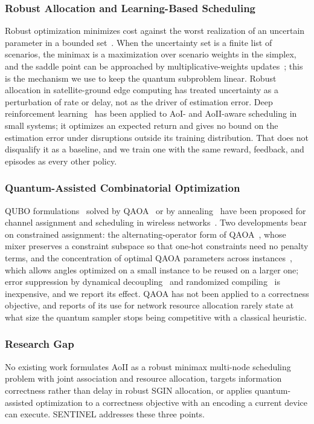 \subsubsection{Robust Allocation and Learning-Based Scheduling}
Robust optimization minimizes cost against the worst realization of an uncertain parameter in a bounded
set~\cite{BenTal2009, Bertsimas2004}. When the uncertainty set is a finite list of scenarios, the minimax is a
maximization over scenario weights in the simplex, and the saddle point can be approached by multiplicative-weights
updates~\cite{Arora2012}; this is the mechanism we use to keep the quantum subproblem linear. Robust allocation in
satellite-ground edge computing has treated uncertainty as a perturbation of rate or delay, not as the driver of
estimation error. Deep reinforcement learning~\cite{Mnih2015, Schulman2017} has been applied to AoI- and AoII-aware
scheduling in small systems; it optimizes an expected return and gives no bound on the estimation error under
disruptions outside its training distribution. That does not disqualify it as a baseline, and we train one with the
same reward, feedback, and episodes as every other policy.

\subsubsection{Quantum-Assisted Combinatorial Optimization}
QUBO formulations~\cite{Lucas2014} solved by QAOA~\cite{Farhi2014} or by annealing~\cite{Albash2018} have been proposed for channel assignment and scheduling in wireless
networks~\cite{Kim2019}. Two developments bear on constrained assignment: the alternating-operator form of
QAOA~\cite{Hadfield2019}, whose mixer preserves a constraint subspace so that one-hot constraints need no penalty
terms, and the concentration of optimal QAOA parameters across instances~\cite{Brandao2018}, which allows angles
optimized on a small instance to be reused on a larger one; error suppression by dynamical
decoupling~\cite{Viola1999} and randomized compiling~\cite{Wallman2016} is inexpensive, and we report its effect.
QAOA has not been applied to a correctness objective, and reports of its use for network resource allocation rarely
state at what size the quantum sampler stops being competitive with a classical heuristic.

\subsubsection{Research Gap}
No existing work formulates AoII as a robust minimax multi-node scheduling problem with joint association and
resource allocation, targets information correctness rather than delay in robust SGIN allocation, or applies
quantum-assisted optimization to a correctness objective with an encoding a current device can execute. SENTINEL
addresses these three points.

